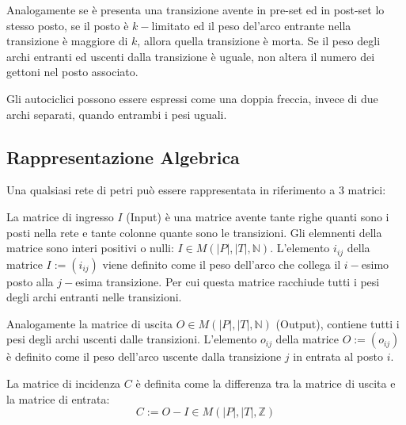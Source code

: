 \documentclass{article}
\numberwithin{equation}{subsection}
\begin{document}
Analogamente se è presenta una transizione avente in pre-set ed in post-set lo stesso posto, se il posto è $k-$limitato ed il peso del'arco entrante nella transizione è maggiore 
di $k$, allora quella transizione è morta. Se il peso degli archi entranti ed uscenti dalla transizione è uguale, non altera il numero dei gettoni nel posto associato. 
\begin{center}
\end{center} 
Gli autociclici possono essere espressi come una doppia freccia, invece di due archi separati, quando entrambi i pesi uguali. 

\subsection{Rappresentazione Algebrica}

Una qualsiasi rete di petri può essere rappresentata in riferimento a $3$ matrici:


La matrice di ingresso $I$ (Input) è una matrice avente tante righe quanti sono i posti nella rete e tante colonne quante sono le transizioni. Gli elemnenti della matrice 
sono interi positivi o nulli: $I\in M(|P|,|T|,\mathbb{N})$. L'elemento $i_{ij}$ della matrice $I:=(i_{ij})$ viene definito come il peso dell'arco che collega il $i-$esimo posto 
alla $j-$esima transizione. Per cui questa matrice racchiude tutti i pesi degli archi entranti nelle transizioni. 

Analogamente la matrice di uscita $O\in M(|P|,|T|,\mathbb{N})$ (Output), contiene tutti i pesi degli archi uscenti dalle transizioni. L'elemento $o_{ij}$ della matrice $O:=(o_{ij})$ 
è definito come il peso dell'arco uscente dalla transizione $j$ in entrata al posto $i$. 


La matrice di incidenza $C$ è definita come la differenza tra la matrice di uscita e la matrice di entrata:
\begin{equation*}
    C:=O-I\in M(|P|,|T|,\mathbb{Z})
\end{equation*}
\end{document}
